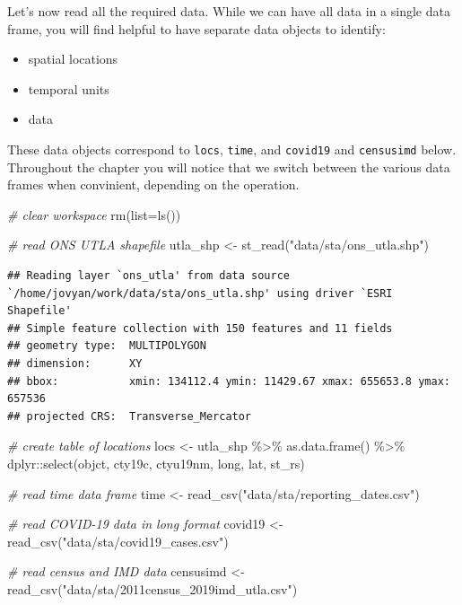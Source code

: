 \documentclass[
]{book}
\newenvironment{Shaded}{\begin{snugshade}}{\end{snugshade}}
\newcommand{\AttributeTok}[1]{\textcolor[rgb]{0.77,0.63,0.00}{#1}}
\newcommand{\CommentTok}[1]{\textcolor[rgb]{0.56,0.35,0.01}{\textit{#1}}}
\newcommand{\FunctionTok}[1]{\textcolor[rgb]{0.00,0.00,0.00}{#1}}
\newcommand{\NormalTok}[1]{#1}
\newcommand{\OtherTok}[1]{\textcolor[rgb]{0.56,0.35,0.01}{#1}}
\newcommand{\SpecialCharTok}[1]{\textcolor[rgb]{0.00,0.00,0.00}{#1}}
\newcommand{\StringTok}[1]{\textcolor[rgb]{0.31,0.60,0.02}{#1}}
\begin{document}
Let's now read all the required data. While we can have all data in a single data frame, you will find helpful to have separate data objects to identify:

\begin{itemize}
\item
  spatial locations
\item
  temporal units
\item
  data
\end{itemize}

These data objects correspond to \texttt{locs}, \texttt{time}, and \texttt{covid19} and \texttt{censusimd} below. Throughout the chapter you will notice that we switch between the various data frames when convinient, depending on the operation.

\begin{Shaded}
\begin{Highlighting}[]
\CommentTok{\# clear workspace}
\FunctionTok{rm}\NormalTok{(}\AttributeTok{list=}\FunctionTok{ls}\NormalTok{())}

\CommentTok{\# read ONS UTLA shapefile}
\NormalTok{utla\_shp }\OtherTok{\textless{}{-}} \FunctionTok{st\_read}\NormalTok{(}\StringTok{"data/sta/ons\_utla.shp"}\NormalTok{) }
\end{Highlighting}
\end{Shaded}

\begin{verbatim}
## Reading layer `ons_utla' from data source `/home/jovyan/work/data/sta/ons_utla.shp' using driver `ESRI Shapefile'
## Simple feature collection with 150 features and 11 fields
## geometry type:  MULTIPOLYGON
## dimension:      XY
## bbox:           xmin: 134112.4 ymin: 11429.67 xmax: 655653.8 ymax: 657536
## projected CRS:  Transverse_Mercator
\end{verbatim}

\begin{Shaded}
\begin{Highlighting}[]
\CommentTok{\# create table of locations}
\NormalTok{locs }\OtherTok{\textless{}{-}}\NormalTok{ utla\_shp }\SpecialCharTok{\%\textgreater{}\%} \FunctionTok{as.data.frame}\NormalTok{() }\SpecialCharTok{\%\textgreater{}\%}
\NormalTok{  dplyr}\SpecialCharTok{::}\FunctionTok{select}\NormalTok{(objct, cty19c, ctyu19nm, long, lat, st\_rs) }

\CommentTok{\# read time data frame}
\NormalTok{time }\OtherTok{\textless{}{-}} \FunctionTok{read\_csv}\NormalTok{(}\StringTok{"data/sta/reporting\_dates.csv"}\NormalTok{)}

\CommentTok{\# read COVID{-}19 data in long format}
\NormalTok{covid19 }\OtherTok{\textless{}{-}} \FunctionTok{read\_csv}\NormalTok{(}\StringTok{"data/sta/covid19\_cases.csv"}\NormalTok{)}

\CommentTok{\# read census and IMD data}
\NormalTok{censusimd }\OtherTok{\textless{}{-}} \FunctionTok{read\_csv}\NormalTok{(}\StringTok{"data/sta/2011census\_2019imd\_utla.csv"}\NormalTok{)}
\end{Highlighting}
\end{Shaded}
\end{document}
